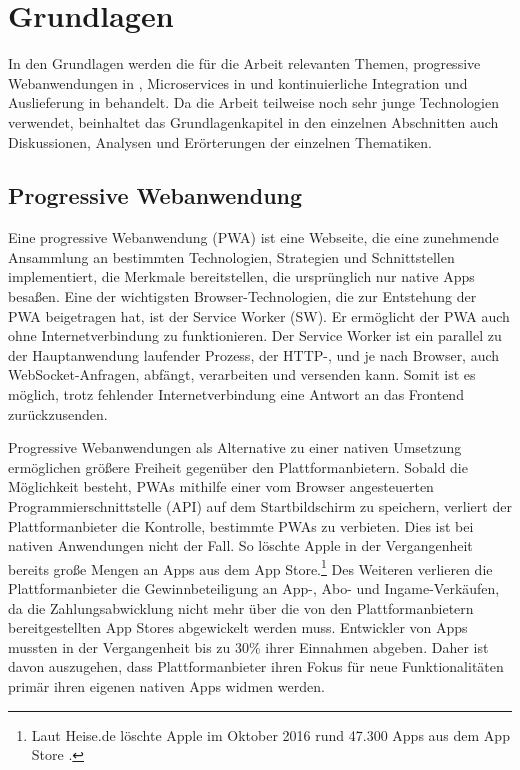 \chapter{Grundlagen}
\label{chap:grundlagen}
In den Grundlagen werden die für die Arbeit relevanten Themen, progressive Webanwendungen in ,
Microservices in  und kontinuierliche Integration und Auslieferung
in  behandelt. Da die Arbeit teilweise noch
sehr junge Technologien verwendet, beinhaltet das Grundlagenkapitel in den einzelnen Abschnitten
auch Diskussionen, Analysen und Erörterungen der einzelnen Thematiken.

\section{Progressive Webanwendung}
\label{sec:progressivewebanwendung}
Eine progressive Webanwendung (PWA) ist eine Webseite, die eine zunehmende Ansammlung
an bestimmten Technologien, Strategien und Schnittstellen implementiert,
die Merkmale bereitstellen, die ursprünglich nur native Apps besaßen. \cite{WikiPWA}
Eine der wichtigsten Browser-Technologien, die zur Entstehung der PWA beigetragen hat,
ist der Service Worker (SW). Er ermöglicht der PWA auch ohne Internetverbindung zu funktionieren. Der 
Service Worker ist ein parallel zu der Hauptanwendung laufender Prozess, der \mbox{HTTP-,} und je nach Browser,
auch WebSocket-Anfragen, abfängt, verarbeiten und versenden kann. Somit ist es möglich, trotz fehlender Internetverbindung
eine Antwort an das Frontend zurückzusenden.\cite{W3ServiceWorker}

Progressive Webanwendungen als Alternative zu einer nativen Umsetzung ermöglichen größere Freiheit gegenüber den
Plattformanbietern. Sobald die Möglichkeit besteht, PWAs mithilfe einer vom Browser angesteuerten Programmierschnittstelle (API)
auf dem Startbildschirm zu speichern, verliert der Plattformanbieter die Kontrolle,
bestimmte PWAs zu verbieten. Dies ist bei nativen Anwendungen nicht der Fall. So löschte Apple in der Vergangenheit
bereits große Mengen an Apps aus dem App Store.\footnote{Laut Heise.de löschte Apple im Oktober
2016 rund 47.300 Apps aus dem App Store \cite{HeiseAppleLoeschtApps}.}
Des Weiteren verlieren die Plattformanbieter die Gewinnbeteiligung an App-, Abo- und Ingame-Verkäufen,
da die Zahlungsabwicklung nicht mehr über die von den Plattformanbietern bereitgestellten App Stores
abgewickelt werden muss. Entwickler von Apps mussten in der Vergangenheit bis zu 30\% 
ihrer Einnahmen abgeben.\cite{WinFutureEigenerAppStore} Daher ist davon auszugehen,
dass Plattformanbieter ihren Fokus für neue Funktionalitäten primär ihren eigenen
nativen Apps widmen werden.

